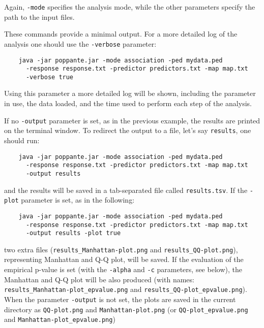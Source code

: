 \documentclass[a4paper,9pt]{article}
\begin{document}
\noindent
Again, \texttt{-mode} specifies the analysis mode, while the other parameters specify the path to the input files. 

\noindent
These commands provide a minimal output. For a more detailed log of the analysis one should use the \texttt{-verbose} parameter:  
\begin{Verbatim}
	java -jar poppante.jar -mode association -ped mydata.ped 
	  -response response.txt -predictor predictors.txt -map map.txt
	  -verbose true
\end{Verbatim}
%
Using this parameter a more detailed log will be shown, including the parameter in use, the data loaded, and the time used to perform each step of the analysis.

\vspace{0.5cm}

\noindent
If no \texttt{-output} parameter is set, as in the previous example, the results are printed on the terminal window. To redirect the output to a file, let's say \texttt{results}, one should run:
\begin{Verbatim}
	java -jar poppante.jar -mode association -ped mydata.ped 
	  -response response.txt -predictor predictors.txt -map map.txt
	  -output results
\end{Verbatim}

\noindent
and the results will be saved in a tab-separated file called \texttt{results.tsv}. If the \texttt{-plot} parameter is set, as in the following:
\begin{Verbatim}
	java -jar poppante.jar -mode association -ped mydata.ped 
	  -response response.txt -predictor predictors.txt -map map.txt
	  -output results -plot true
\end{Verbatim}

\noindent
two extra files (\texttt{results\_Manhattan-plot.png} and \texttt{results\_QQ-plot.png}), representing Manhattan and Q-Q plot, will be saved. If the evaluation of the empirical p-value is set (with the \texttt{-alpha} and \texttt{-c} parameters, see below), the Manhattan and Q-Q plot will be also produced (with names: \texttt{results\_Manhattan-plot\_epvalue.png} and \texttt{results\_QQ-plot\_epvalue.png}). When the parameter \texttt{-output} is not set, the plots are saved in the current directory as \texttt{QQ-plot.png} and \texttt{Manhattan-plot.png} (or \texttt{QQ-plot\_epvalue.png} and \texttt{Manhattan-plot\_epvalue.png})

\vspace{0.5cm}
\end{document}
